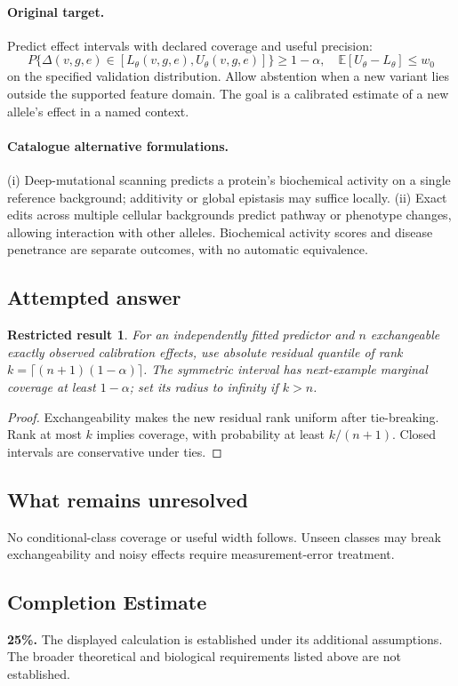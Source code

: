 \documentclass[11pt]{article}
\newcommand{\E}{\mathbb E}
\providecommand{\E}{\mathbb E}
\newtheorem{attemptresult}{Restricted result}[section]
\begin{document}
\paragraph{Original target.}
Predict effect intervals with declared coverage and useful precision:
\[
P\{\Delta(v,g,e)\in[L_\theta(v,g,e),U_\theta(v,g,e)]\}\geq1-\alpha,
\quad \E[U_\theta-L_\theta]\leq w_0
\]
on the specified validation distribution. Allow abstention when a new variant lies outside the supported feature domain. The goal is a calibrated estimate of a new allele's effect in a named context.
\paragraph{Catalogue alternative formulations.}
(i) Deep-mutational scanning predicts a protein's biochemical activity on a single reference background; additivity or global epistasis may suffice locally. (ii) Exact edits across multiple cellular backgrounds predict pathway or phenotype changes, allowing interaction with other alleles. Biochemical activity scores and disease penetrance are separate outcomes, with no automatic equivalence.
\subsection{Attempted answer}
\begin{attemptresult}
For an independently fitted predictor and $n$ exchangeable exactly observed calibration effects, use absolute residual quantile of rank $k=\lceil(n+1)(1-\alpha)\rceil$. The symmetric interval has next-example marginal coverage at least $1-\alpha$; set its radius to infinity if $k>n$.
\end{attemptresult}
\begin{proof}
Exchangeability makes the new residual rank uniform after tie-breaking. Rank at most $k$ implies coverage, with probability at least $k/(n+1)$. Closed intervals are conservative under ties.
\end{proof}
\subsection{What remains unresolved}
No conditional-class coverage or useful width follows. Unseen classes may break exchangeability and noisy effects require measurement-error treatment.
\subsection{Completion Estimate}
\textbf{25\%.} The displayed calculation is established under its additional assumptions. The broader theoretical and biological requirements listed above are not established.
\end{document}
